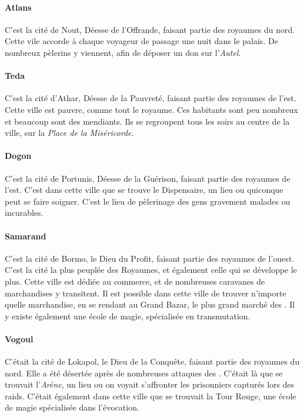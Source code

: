\documentclass[a4paper,10pt,openany]{book}
\begin{document}
\begin{multicols}{2}
\paragraph{Atlans}
C’est la cité de Nout, Déesse de l’Offrande, faisant partie des royaumes du nord. Cette vile accorde à chaque voyageur de passage une nuit dans le
palais. De nombreux pèlerins y viennent, afin de déposer un don sur l’\emph{Autel}.
\paragraph{Teda}
C’est la cité d’Athar, Déesse de la Pauvreté, faisant partie des royaumes de l’est. Cette ville est pauvre, comme tout le royaume. Ces habitants sont
peu nombreux et beaucoup sont des mendiants. Ils se regroupent tous les soirs au centre de la ville, sur la \emph{Place de la Miséricorde}.
\paragraph{Dogon}
C’est la cité de Portunis, Déesse de la Guérison, faisant partie des royaumes de l’est. C’est dans cette ville que se trouve le Dispensaire, un lieu
ou quiconque peut se faire soigner. C’est le lieu de pèlerinage des gens gravement malades ou incurables.
\paragraph{Samarand}
C’est la cité de Bormo, le Dieu du Profit, faisant partie des royaumes de l’ouest. C’est la cité la plus peuplée des Royaumes, et également celle qui
se développe le plus. Cette ville est dédiée au commerce, et de nombreuses caravanes de marchandises y transitent. Il est possible dans cette ville de
trouver n’importe quelle marchandise, en se rendant au Grand Bazar, le plus grand marché des \Royaumes. Il y existe également une école de magie,
spécialisée en transmutation.
\paragraph{Vogoul}
C’était la cité de Lokapol, le Dieu de la Conquête, faisant partie des royaumes du nord. Elle a été désertée après de nombreuses attaques des
\DemiOrcs. C’était là que se trouvait l’\emph{Arène}, un lieu ou on voyait s’affronter les prisonniers capturés lors des raids. C’était également dans
cette ville que se trouvait la Tour Rouge, une école de magie spécialisée dans l’évocation.
\end{multicols}
\end{document}
